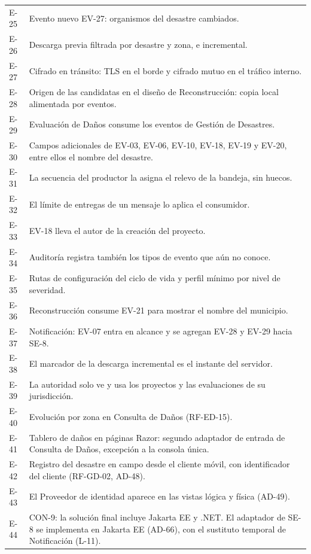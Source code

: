 \documentclass[11pt,letterpaper]{article}
\begin{document}
\begin{longtable}{L{1.4cm} L{14.4cm}}
E-25 & Evento nuevo EV-27: organismos del desastre cambiados. \\
E-26 & Descarga previa filtrada por desastre y zona, e incremental. \\
E-27 & Cifrado en tránsito: TLS en el borde y cifrado mutuo en el tráfico interno. \\
E-28 & Origen de las candidatas en el diseño de Reconstrucción: copia local alimentada por eventos. \\
E-29 & Evaluación de Daños consume los eventos de Gestión de Desastres. \\
E-30 & Campos adicionales de EV-03, EV-06, EV-10, EV-18, EV-19 y EV-20, entre ellos el nombre del desastre. \\
E-31 & La secuencia del productor la asigna el relevo de la bandeja, sin huecos. \\
E-32 & El límite de entregas de un mensaje lo aplica el consumidor. \\
E-33 & EV-18 lleva el autor de la creación del proyecto. \\
E-34 & Auditoría registra también los tipos de evento que aún no conoce. \\
E-35 & Rutas de configuración del ciclo de vida y perfil mínimo por nivel de severidad. \\
E-36 & Reconstrucción consume EV-21 para mostrar el nombre del municipio. \\
E-37 & Notificación: EV-07 entra en alcance y se agregan EV-28 y EV-29 hacia SE-8. \\
E-38 & El marcador de la descarga incremental es el instante del servidor. \\
E-39 & La autoridad solo ve y usa los proyectos y las evaluaciones de su jurisdicción. \\
E-40 & Evolución por zona en Consulta de Daños (RF-ED-15). \\
E-41 & Tablero de daños en páginas Razor: segundo adaptador de entrada de Consulta de Daños, excepción a la consola única. \\
E-42 & Registro del desastre en campo desde el cliente móvil, con identificador del cliente (RF-GD-02, AD-48). \\
E-43 & El Proveedor de identidad aparece en las vistas lógica y física (AD-49). \\
E-44 & CON-9: la solución final incluye Jakarta EE y .NET. El adaptador de SE-8 se implementa en Jakarta EE (AD-66), con el sustituto temporal de Notificación (L-11). \\
\end{longtable}
\end{document}
